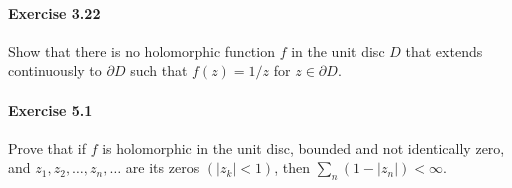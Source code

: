 \documentclass{article}
\begin{document}
\paragraph{Exercise 3.22} Show that there is no holomorphic function $f$ in the unit disc $D$ that extends continuously to $\partial D$ such that $f(z) = 1/z$ for $z \in \partial D$.


\paragraph{Exercise 5.1} Prove that if $f$ is holomorphic in the unit disc, bounded and not identically zero, and $z_{1}, z_{2}, \ldots, z_{n}, \ldots$ are its zeros $\left(\left|z_{k}\right|<1\right)$, then $\sum_{n}\left(1-\left|z_{n}\right|\right)<\infty$.
\end{document}
